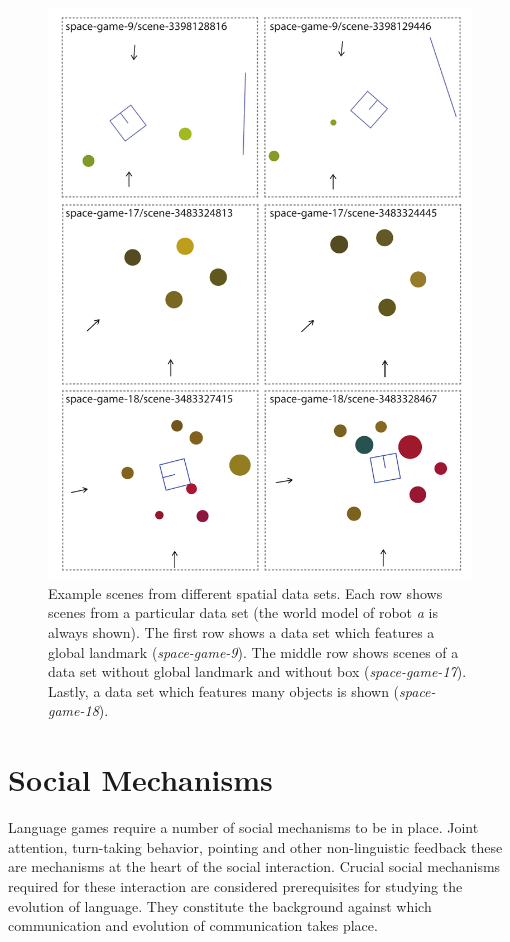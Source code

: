 \begin{figure}
\begin{center}
\includegraphics[width=0.8\columnwidth]{figs/spatial-scenes-overview-2}
\end{center}
\caption[Example scenes]{Example scenes from different 
spatial data sets. Each row shows 
scenes from a particular data set (the world model of 
robot \emph{a} is always shown). 
The first row shows a data set which features a global landmark 
(\emph{space-game-9}).
The middle row shows scenes of a data set without global landmark and
without box (\emph{space-game-17}). Lastly, a data set which features 
many objects is shown (\emph{space-game-18}).}
\label{f:spatial-scenes-2}
\end{figure}

\section{Social Mechanisms}
\label{s:social-mechanisms}
Language games require a number of social mechanisms to be in place. Joint attention, 
turn-taking behavior, pointing and other non-linguistic feedback these are mechanisms 
at the heart of the social interaction. Crucial social mechanisms required for these interaction 
are  considered prerequisites for studying the evolution of language. They constitute the 
background against which communication and evolution of communication takes place.

